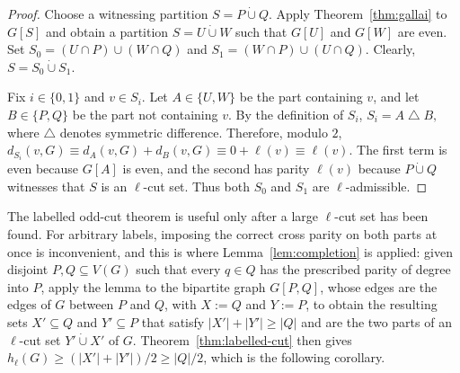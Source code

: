 \documentclass[10pt,a4paper]{amsart}
\newcommand{\VV}[1]{{#1}}
\newcommand{\dotcupop}{\mathbin{\dot\cup}}
\newcommand{\1}{\mathbf{1}}
\begin{document}
	\begin{proof}
		Choose a witnessing partition $S=P\dotcupop Q$.  Apply
		Theorem~\ref{thm:gallai} to $G[S]$ and obtain a partition
		$S=U\dotcupop W$ such that $G[U]$ and $G[W]$ are even.  Set
		$S_0=(U\cap P)\cup(W\cap Q)$
		and 
		$ S_1=(W\cap P)\cup(U\cap Q).$
		Clearly, $S=S_0\dotcupop S_1$.
		
		Fix $i\in\{0,1\}$ and $v\in S_i$.  Let $A\in\{U,W\}$ be the part containing
		$v$, and let $B\in\{P,Q\}$ be the part not containing $v$.  By the
		definition of $S_i$,
		$
		S_i=A\mathbin{\triangle}B,
		$
		where $\triangle$ denotes symmetric difference. 
		Therefore, modulo $2$,
		$
		d_{S_i}(v,G)
		\equiv d_A(v,G)+d_B(v,G)
		\equiv 0+\ell(v)
		\equiv \ell(v).
		$
		The first term is even because $G[A]$ is even, and the second has parity
		$\ell(v)$ because $P\dotcupop Q$ witnesses that $S$ is an $\ell$-cut set.
		Thus both $S_0$ and $S_1$ are $\ell$-admissible.  \end{proof}
	
	
	
	The labelled odd-cut theorem is useful only after a large $\ell$-cut set has been found. For arbitrary labels, imposing the correct cross parity on both parts at once is inconvenient, and this is where Lemma~\ref{lem:completion} is applied: given disjoint $P,Q\subseteq V(G)$ such that every $q\in Q$ has the prescribed parity of degree into $P$, apply the lemma to the
    bipartite graph $G[P,Q]$, whose edges are the edges of $G$ between $P$ and $Q$, with $X:=Q$ and $Y:=P$, to obtain the resulting sets $X'\subseteq Q$ and $Y'\subseteq P$ \VV{that} satisfy $|X'|+|Y'|\ge |Q|$ and are the two parts of an $\ell$-cut set $Y'\dotcupop X'$ of $G$.  Theorem~\ref{thm:labelled-cut} then gives $h_\ell(G)\ge (|X'|+|Y'|)/2\ge |Q|/2$, which is the following corollary.
	
\end{document}
